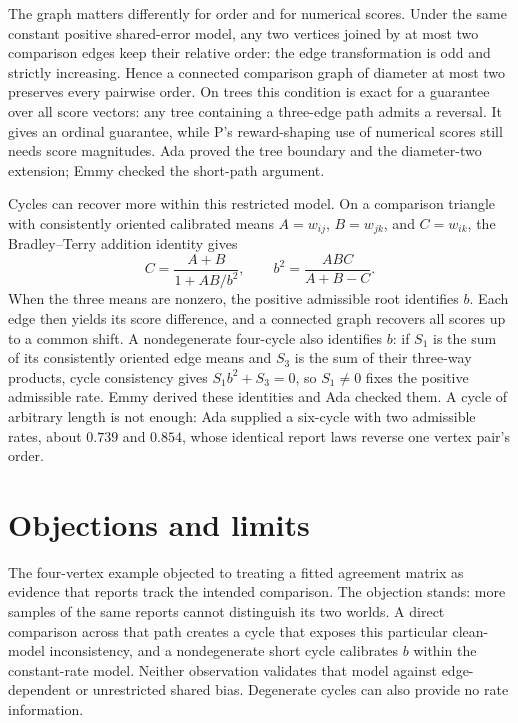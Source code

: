 \documentclass{article}
\begin{document}
The graph matters differently for order and for numerical scores. Under the same constant positive
shared-error model, any two vertices joined by at most two comparison edges keep their relative order: the
edge transformation is odd and strictly increasing. Hence a connected comparison graph of diameter at most two
preserves every pairwise order. On trees this condition is exact for a guarantee over all score vectors: any
tree containing a three-edge path admits a reversal. It gives an ordinal guarantee, while P's reward-shaping
use of numerical scores still needs score magnitudes. Ada proved the tree boundary and the diameter-two
extension; Emmy checked the short-path argument.

Cycles can recover more within this restricted model. On a comparison triangle with consistently oriented
calibrated means \(A=w_{ij}\), \(B=w_{jk}\), and \(C=w_{ik}\), the Bradley--Terry addition identity gives
\[
C=\frac{A+B}{1+AB/b^2},\qquad
b^2=\frac{ABC}{A+B-C}.
\]
When the three means are nonzero, the positive admissible root identifies \(b\). Each edge then yields its
score difference, and a connected graph recovers all scores up to a common shift. A nondegenerate four-cycle
also identifies \(b\): if \(S_1\) is the sum of its consistently oriented edge means and \(S_3\) is the sum of
their three-way products, cycle consistency gives \(S_1b^2+S_3=0\), so \(S_1\ne0\) fixes the positive
admissible rate. Emmy derived these identities and Ada checked them. A cycle of arbitrary length is not
enough: Ada supplied a six-cycle with two admissible rates, about \(0.739\) and \(0.854\), whose identical
report laws reverse one vertex pair's order.

\section{Objections and limits}

The four-vertex example objected to treating a fitted agreement matrix as evidence that reports track the
intended comparison. The objection stands: more samples of the same reports cannot distinguish its two worlds.
A direct comparison across that path creates a cycle that exposes this particular clean-model inconsistency,
and a nondegenerate short cycle calibrates \(b\) within the constant-rate model. Neither observation validates
that model against edge-dependent or unrestricted shared bias. Degenerate cycles can also provide no rate
information.
\end{document}

